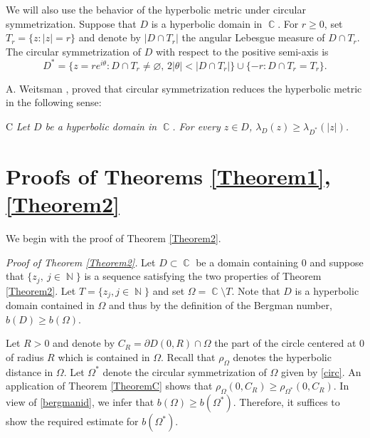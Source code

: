 \documentclass[11pt, letterpaper,leqno]{amsart}
\numberwithin{equation}{section}
\theoremstyle{definition}
\DeclareMathOperator{\N}{\mathbb{N}}
\DeclareMathOperator{\C}{\mathbb{C}}
\begin{document}
We will also use the behavior of the hyperbolic metric under circular symmetrization. Suppose that $D$ is a hyperbolic domain in $\C$. For  $r\geq 0$, set $T_r=\{z:|z|=r\}$ and denote by $|D\cap T_r|$ the angular Lebesgue measure of $D\cap T_r$. 
The circular symmetrization of $D$ with respect to the
positive semi-axis is
\begin{equation}
\label{circ}
D^*= \{z=re^{i\theta}: D\cap T_r \neq \varnothing,\, 2|\theta | <|D\cap T_r| \}
\cup \{-r:D\cap T_r=T_r\}.
\end{equation}

A. Weitsman \cite{Weitsman}, \cite[page 698]{Hay} proved that circular symmetrization reduces the hyperbolic metric in the following sense:

\begin{customthm}{C}\label{TheoremC}
	\textit{
		Let $D$ be a hyperbolic domain in $\C$. For every $z\in D$, 	$\lambda_D(z)\geq \lambda_{D^*}(|z|)$.
	}
\end{customthm}





\section{Proofs of Theorems \ref{Theorem1}, \ref{Theorem2}}
We begin with the proof of Theorem \ref{Theorem2}.

\noindent\textit{Proof of Theorem \ref{Theorem2}.}
Let $D\subset\C$ be a domain containing $0$ and suppose that $\{z_j,\ j\in\N\}$ is a sequence satisfying the two properties of Theorem \ref{Theorem2}. Let $T=\{z_j, j\in\N\}$ and set $\Omega=\C\setminus T$. Note that $D$ is a hyperbolic domain contained in $\Omega$ and thus by the definition of the Bergman number, $b(D)\geq b(\Omega)$. 

Let $R>0$ and denote by $C_R=\partial D(0,R)\cap \Omega$ the part of the circle centered at $0$ of radius $R$ which is contained in $\Omega$. Recall that $\rho_\Omega$ denotes the hyperbolic distance in $\Omega$.  Let $\Omega^*$ denote the circular symmetrization of $\Omega$ given by \eqref{circ}. An application of Theorem \ref{TheoremC} shows that $\rho_\Omega(0,C_R)\geq \rho_{\Omega^*}(0,C_R)$. In view of \eqref{bergmanid}, we infer that $b(\Omega)\geq b(\Omega^*)$. Therefore, it suffices to show the required estimate for $b(\Omega^*)$.
\end{document}
